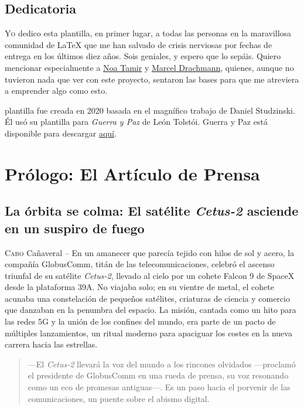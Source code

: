 \chapter*{Dedicatoria}

\lettrine[lines=2, loversize=0.3, lraise=0]{\initfamily Y}{o} dedico esta plantilla, en primer lugar, a todas las personas en la maravillosa comunidad de LaTeX que me han salvado de crisis nerviosas por fechas de entrega en los últimos diez años. Sois geniales, y espero que lo sepáis. Quiero mencionar especialmente a \href{http://www.noatamir.com/}{Noa Tamir} y \href{https://www.zib.de/de/members/drachmann}{Marcel Drachmann}, quienes, aunque no tuvieron nada que ver con este proyecto, sentaron las bases para que me atreviera a emprender algo como esto.

 plantilla fue creada en 2020 basada en el magnífico trabajo de Daniel Studzinski. Él usó su plantilla para \emph{Guerra y Paz} de León Tolstói. Guerra y Paz está disponible para descargar \href{https://www.overleaf.com/articles/war-and-peace/kdgcwgqzrrfd}{aquí}.

\part*{Prólogo: El Artículo de Prensa}

\chapter*{La órbita se colma: El satélite \emph{Cetus-2} asciende en un suspiro de fuego}

\lettrine[lines=2, loversize=0.3, lraise=0]{C}{abo} Cañaveral -- En un amanecer que parecía tejido con hilos de sol y acero, la compañía GlobusComm, titán de las telecomunicaciones, celebró el ascenso triunfal de su satélite \emph{Cetus-2}, llevado al cielo por un cohete Falcon 9 de SpaceX desde la plataforma 39A. No viajaba solo; en su vientre de metal, el cohete acunaba una constelación de pequeños satélites, criaturas de ciencia y comercio que danzaban en la penumbra del espacio. La misión, cantada como un hito para las redes 5G y la unión de los confines del mundo, era parte de un pacto de múltiples lanzamientos, un ritual moderno para apaciguar los costes en la nueva carrera hacia las estrellas.

\begin{quote}
\calli
---El \emph{Cetus-2} llevará la voz del mundo a los rincones olvidados ---proclamó el presidente de GlobusComm en una rueda de prensa, su voz resonando como un eco de promesas antiguas---. Es un paso hacia el porvenir de las comunicaciones, un puente sobre el abismo digital.
\end{quote}

